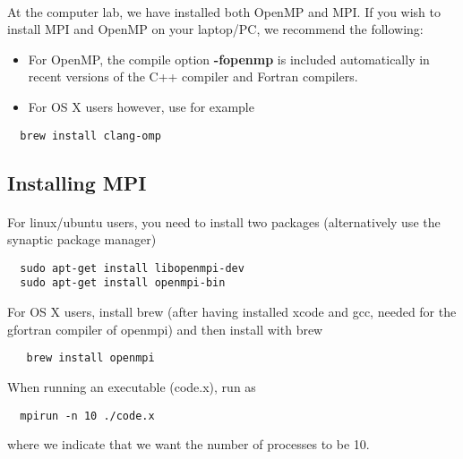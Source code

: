 \documentclass[%
oneside,                 %
final,                   %
10pt]{article}
\begin{document}
\paragraph{}
At the computer lab, we have installed both OpenMP and MPI. If you wish to install MPI and OpenMP 
on your laptop/PC, we recommend the following:
\begin{itemize}
\item For OpenMP, the compile option \textbf{-fopenmp} is included automatically in recent versions of the C++ compiler and Fortran compilers. 

\item For OS X users however, use for example 
\end{itemize}

\noindent
\begin{verbatim}
  brew install clang-omp
\end{verbatim}





\subsection*{Installing MPI}

\paragraph{}
For linux/ubuntu users, you need to install two packages (alternatively use the synaptic package manager)
\begin{verbatim}
  sudo apt-get install libopenmpi-dev
  sudo apt-get install openmpi-bin
\end{verbatim}
For OS X users, install brew (after having installed xcode and gcc, needed for the 
gfortran compiler of openmpi) and then install with brew
\begin{verbatim}
   brew install openmpi
\end{verbatim}
When running an executable (code.x), run as
\begin{verbatim}
  mpirun -n 10 ./code.x
\end{verbatim}
where we indicate that we want  the number of processes to be 10.
\end{document}
